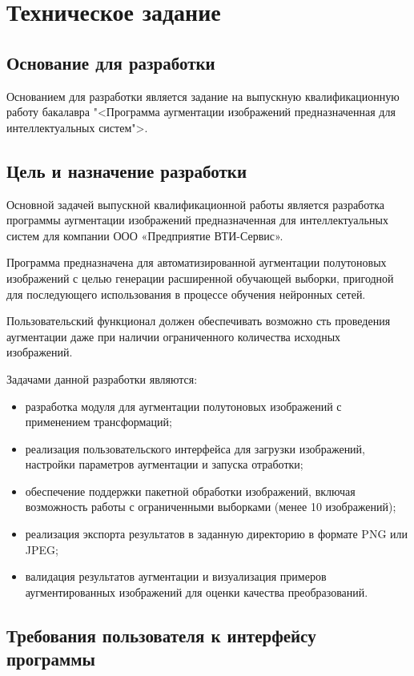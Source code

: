 \section{Техническое задание}
\subsection{Основание для разработки}

Основанием для разработки является задание на выпускную квалификационную работу бакалавра "<Программа аугментации изображений предназначенная для интеллектуальных систем">.

\subsection{Цель и назначение разработки}

Основной задачей выпускной квалификационной работы является разработка программы аугментации изображений предназначенная для интеллектуальных систем для компании ООО «Предприятие ВТИ-Сервис».

Программа предназначена для автоматизированной аугментации полутоновых изображений с целью генерации расширенной обучающей выборки, пригодной для последующего использования в процессе обучения нейронных сетей.

Пользовательский функционал должен обеспечивать возможно сть проведения аугментации даже при наличии ограниченного количества исходных изображений.

Задачами данной разработки являются:

\begin{itemize}
\item разработка модуля для аугментации полутоновых изображений с применением трансформаций;
\item реализация пользовательского интерфейса для загрузки изображений, настройки параметров аугментации и запуска отработки;
\item обеспечение поддержки пакетной обработки изображений, включая возможность работы с ограниченными выборками (менее 10 изображений);
\item реализация экспорта результатов в заданную директорию в формате PNG или JPEG;
\item валидация результатов аугментации и визуализация примеров аугментированных изображений для оценки качества преобразований.
\end{itemize}

\subsection{Требования пользователя к интерфейсу программы}


